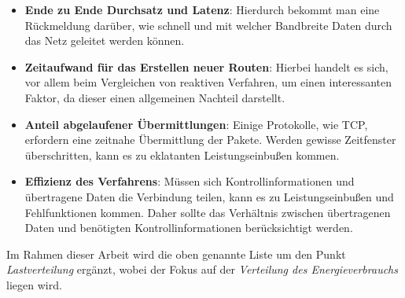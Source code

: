 \begin{itemize}
\item \textbf{Ende zu Ende Durchsatz und Latenz}: Hierdurch bekommt man eine Rückmeldung darüber, wie schnell und mit welcher Bandbreite Daten durch das Netz geleitet werden können.
\item \textbf{Zeitaufwand für das Erstellen neuer Routen}: Hierbei handelt es sich, vor allem beim Vergleichen von reaktiven Verfahren, um einen interessanten Faktor, da dieser einen allgemeinen Nachteil darstellt.
\item \textbf{Anteil abgelaufener Übermittlungen}: Einige Protokolle, wie TCP, erfordern eine zeitnahe Übermittlung der Pakete. Werden gewisse Zeitfenster überschritten, kann es zu eklatanten Leistungseinbußen kommen.
\item \textbf{Effizienz des Verfahrens}: Müssen sich Kontrollinformationen und übertragene Daten die Verbindung teilen, kann es zu Leistungseinbußen und Fehlfunktionen kommen. Daher sollte das Verhältnis zwischen übertragenen Daten und benötigten Kontrollinformationen berücksichtigt werden.
\end{itemize}

Im Rahmen dieser Arbeit wird die oben genannte Liste um den Punkt \textit{Lastverteilung} ergänzt, wobei der Fokus auf der \textit{Verteilung des Energieverbrauchs} liegen wird.
